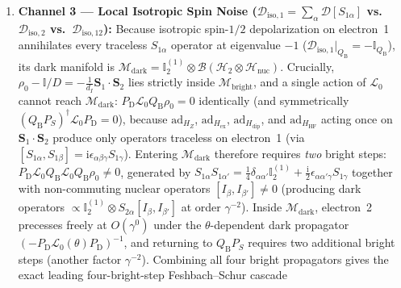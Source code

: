 \documentclass[twocolumn,10pt,amsmath,amssymb,floatfix]{revtex4-2}
\theoremstyle{plain}
\theoremstyle{definition}
\newcommand{\ii}{\mathrm{i}}
\newcommand{\Tr}{\operatorname{Tr}}
\newcommand{\PS}{P_S}
\newcommand{\PT}{P_T}
\newcommand{\HZ}{H_Z}
\newcommand{\HHF}{H_{\mathrm{HF}}}
\newcommand{\Hex}{H_{\mathrm{ex}}}
\newcommand{\Hdip}{H_{\mathrm{dip}}}
\newcommand{\DeltaPhi}{\Delta\Phi_S}
\newcommand{\leanid}[1]{{\footnotesize\ttfamily\def\_{\textunderscore\allowbreak}#1}}
\begin{document}
\begin{enumerate}[leftmargin=1.4em,itemsep=2pt]
\begin{align}
\DeltaPhi^{\mathrm{STD}} &= \frac{1}{k\gamma^2}\,\Delta_\theta\Tr\!\Bigl[\PS G_1 \bigl(-L_{\mathrm{D}}(\theta)\bigr)^{-1} G_1(\rho_0)\Bigr] \nonumber\\
&\quad + O(\gamma^{-3}),
\end{align}
in which $G_1(\rho_0)$ excites triplet-subspace populations/coherences inside $\PT\mathcal{B}(\mathcal{H})\PT$ that precess under the $\theta$-dependent dark Zeeman propagator $(-L_{\mathrm{D}}(\theta))^{-1}$ before returning to $\PS$. On the canonical $8\times 8$ system, Eq.~\eqref{eq:STD_dark_iterate} evaluates analytically to $+4.51208\,\xi^{-2}$, matching the exact 45-digit Liouvillian yield $+4.50600\,\xi^{-2}$ at $\xi=10^4$ to $0.13\%$ ($\alpha = 1.975$--$1.988$ in $8\times 8$, $1.912$ in $12\times 12$, $1.892$ canonical $36\times 36$; a rate-scaled reduced two-mode surrogate of this Zeno $M_2$-cancellation mechanism is formalized in Lean Theorem~\leanid{std\_zeno\_two\_sided\_xi2}).
\item \textbf{Channel 3 --- Local Isotropic Spin Noise ($\mathcal{D}_{\mathrm{iso},1} = \sum_\alpha \mathcal{D}[S_{1\alpha}]$ vs.\ $\mathcal{D}_{\mathrm{iso},2}$ vs.\ $\mathcal{D}_{\mathrm{iso},12}$):} Because isotropic spin-$1/2$ depolarization on electron~1 annihilates every traceless $S_{1\alpha}$ operator at eigenvalue $-1$ ($\mathcal{D}_{\mathrm{iso},1}|_{Q_{\mathrm{B}}} = -\mathbb{I}_{Q_{\mathrm{B}}}$), its dark manifold is $\mathcal{M}_{\mathrm{dark}} = \mathbb{I}_2^{(1)} \otimes \mathcal{B}(\mathcal{H}_2 \otimes \mathcal{H}_{\mathrm{nuc}})$. Crucially, $\rho_0 - \mathbb{I}/D = -\frac{1}{d_I}\mathbf{S}_1\cdot\mathbf{S}_2$ lies strictly inside $\mathcal{M}_{\mathrm{bright}}$, and a single action of $\mathcal{L}_0$ cannot reach $\mathcal{M}_{\mathrm{dark}}$: $P_{\mathrm{D}}\mathcal{L}_0 Q_{\mathrm{B}}\rho_0 = 0$ identically (and symmetrically $(Q_{\mathrm{B}}\PS)^\dagger \mathcal{L}_0 P_{\mathrm{D}} = 0$), because $\mathrm{ad}_{\HZ}$, $\mathrm{ad}_{\Hex}$, $\mathrm{ad}_{\Hdip}$, and $\mathrm{ad}_{\HHF}$ acting once on $\mathbf{S}_1\cdot\mathbf{S}_2$ produce only operators traceless on electron~1 (via $[S_{1\alpha}, S_{1\beta}] = \ii\epsilon_{\alpha\beta\gamma}S_{1\gamma}$). Entering $\mathcal{M}_{\mathrm{dark}}$ therefore requires \emph{two} bright steps: $P_{\mathrm{D}}\mathcal{L}_0 Q_{\mathrm{B}}\mathcal{L}_0 Q_{\mathrm{B}}\rho_0 \neq 0$, generated by $S_{1\alpha}S_{1\alpha'} = \frac{1}{4}\delta_{\alpha\alpha'}\mathbb{I}_2^{(1)} + \frac{\ii}{2}\epsilon_{\alpha\alpha'\gamma}S_{1\gamma}$ together with non-commuting nuclear operators $[I_\beta, I_{\beta'}] \neq 0$ (producing dark operators $\propto \mathbb{I}_2^{(1)} \otimes S_{2\alpha}[I_\beta,I_{\beta'}]$ at order $\gamma^{-2}$). Inside $\mathcal{M}_{\mathrm{dark}}$, electron~2 precesses freely at $O(\gamma^0)$ under the $\theta$-dependent dark propagator $(-P_{\mathrm{D}}\mathcal{L}_0(\theta)P_{\mathrm{D}})^{-1}$, and returning to $Q_{\mathrm{B}}\PS$ requires two additional bright steps (another factor $\gamma^{-2}$). Combining all four bright propagators gives the exact leading four-bright-step Feshbach--Schur cascade

\end{enumerate}
\end{document}
